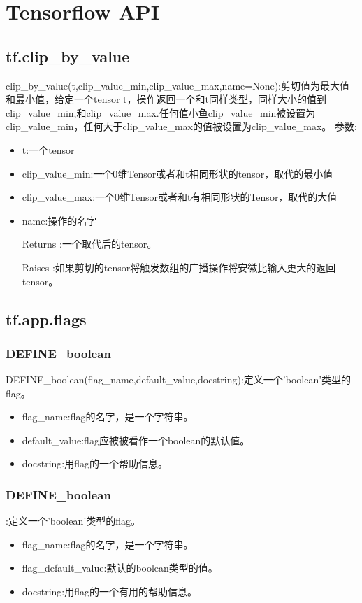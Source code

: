 \chapter{Tensorflow API}
\section{tf.clip\_by\_value}
clip\_by\_value(t,clip\_value\_min,clip\_value\_max,name=None):剪切值为最大值和最小值，给定一个tensor t，操作返回一个和t同样类型，同样大小的值到clip\_value\_min,和clip\_value\_max.任何值小鱼clip\_value\_min被设置为clip\_value\_min，任何大于clip\_value\_max的值被设置为clip\_value\_max。
参数:
\begin{itemize}
	\item t:一个tensor
	\item clip\_value\_min:一个0维Tensor或者和t相同形状的tensor，取代的最小值
	\item clip\_value\_max:一个0维Tensor或者和t有相同形状的Tensor，取代的大值
	\item name:操作的名字
	\item[Returns]:一个取代后的tensor。
	\item[Raises]:如果剪切的tensor将触发数组的广播操作将安徽比输入更大的返回tensor。
\end{itemize}
\section{tf.app.flags}
\subsection{DEFINE\_boolean}
DEFINE\_boolean(flag\_name,default\_value,docstring):定义一个'boolean'类型的flag。
\begin{itemize}
\item flag\_name:flag的名字，是一个字符串。
\item default\_value:flag应被被看作一个boolean的默认值。
\item docstring:用flag的一个帮助信息。
\end{itemize}
\subsection{DEFINE\_boolean}:定义一个'boolean'类型的flag。
\begin{itemize}
\item flag\_name:flag的名字，是一个字符串。
\item flag\_default\_value:默认的boolean类型的值。
\item docstring:用flag的一个有用的帮助信息。
\end{itemize}
